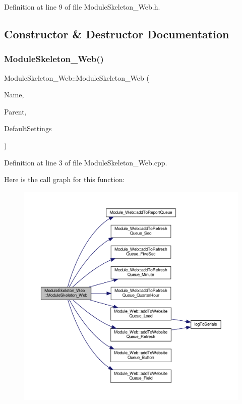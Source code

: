 Definition at line 9 of file Module\+Skeleton\+\_\+\+Web.\+h.



\subsection{Constructor \& Destructor Documentation}
\mbox{\label{class_module_skeleton___web_aec8ecee521cba264f403e7ff08d178d8}} 
\subsubsection{\texorpdfstring{Module\+Skeleton\+\_\+\+Web()}{ModuleSkeleton\_Web()}}
{\footnotesize\ttfamily Module\+Skeleton\+\_\+\+Web\+::\+Module\+Skeleton\+\_\+\+Web (\begin{DoxyParamCaption}\item[{const \+\_\+\+\_\+\+Flash\+String\+Helper $\ast$}]{Name,  }\item[{\hyperlink{class_module___web}{Module\+\_\+\+Web} $\ast$}]{Parent,  }\item[{\hyperlink{struct_settings_1_1_module_skeleton_settings}{Settings\+::\+Module\+Skeleton\+Settings} $\ast$}]{Default\+Settings }\end{DoxyParamCaption})}



Definition at line 3 of file Module\+Skeleton\+\_\+\+Web.\+cpp.

Here is the call graph for this function\+:
\nopagebreak
\begin{figure}[H]
\begin{center}
\leavevmode
\includegraphics[width=350pt]{class_module_skeleton___web_aec8ecee521cba264f403e7ff08d178d8_cgraph}
\end{center}
\end{figure}



